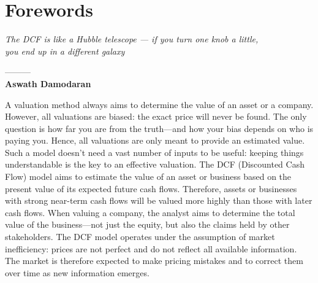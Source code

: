 










\newpage
\onehalfspacing


\newlength{\cftparagraphindent}
\setlength{\cftparagraphindent}{110pt} %
\newlength{\cftparagraphnumwidth}
\setlength{\cftparagraphnumwidth}{4.6em} %



\tableofcontents

\newpage




\chapter*{Forewords}




\begin{center}
    \textit{The DCF is like a Hubble telescope — if you turn one knob a little,\\ you end up in a different galaxy} 

    ---------\\
    \textbf{Aswath Damodaran}
\end{center}

\vfill

\lettrine{A}{} valuation method always aims to determine the value of an asset or a company. However, all valuations are biased: the exact price will never be found. The only question is how far you are from the truth—and how your bias depends on who is paying you. Hence, all valuations are only meant to provide an estimated value. Such a model doesn't need a vast number of inputs to be useful: keeping things understandable is the key to an effective valuation. The DCF (Discounted Cash Flow) model aims to estimate the value of an asset or business based on the present value of its expected future cash flows. Therefore, assets or businesses with strong near-term cash flows will be valued more highly than those with later cash flows. When valuing a company, the analyst aims to determine the total value of the business—not just the equity, but also the claims held by other stakeholders. The DCF model operates under the assumption of market inefficiency: prices are not perfect and do not reflect all available information. The market is therefore expected to make pricing mistakes and to correct them over time as new information emerges.




